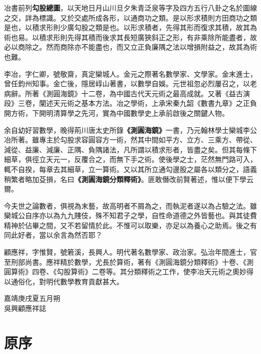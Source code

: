 \documentclass[11pt,a4paper]{article}
\begin{document}
冶書前列\textbf{勾股總圖}，以天地日月山川旦夕朱青泛泉等字及四方五行八卦之名於圖線之交，詳為標識。又於交處所成各形，以通商功之類。是以形求積則方田商功之類是也，以積求形則少廣勾股之類是也。以形求積者，先得其形而復求其積，故其為術也易。以積求形則先得其積而後求其長短廣狹斜正之形，有非乘除所能盡者，故必以商除之。然而商除亦不能盡也，而又立正負廉隅之法以增損附益之，故其為術也難。

李冶，字仁卿，號敬齋，真定欒城人。金元之際著名數學家、文學家。金末進士，曾任鈞州知事。金亡後，隱居崞山著書，以數學自娛。元世祖忽必烈屢召之，以老病辭。所著《測圓海鏡》十二卷，為中國古代天元術之最高成就。又著《益古演段》三卷，闡述天元術之基本方法。冶之學術，上承宋秦九韶《數書九章》之正負開方術，下開明清算學之先河，實為中國數學史上承前啟後之關鍵人物。

余自幼好習數學，晚得荊川唐太史所錄\textbf{《測圓海鏡》}一書，乃元翰林學士欒城李公冶所著。雖專主於勾股求容圓容方一術，然其中間如平方、立方、三乘方、帶從、減從、益廉、減廉、正隅、負隅諸法，凡所謂以積求形者，皆盡之矣。但其每條下細草，俱徑立天元一，反覆合之，而無下手之術。使後學之士，茫然無門路可入，輒不自揆，每章去其細草，立一算術。又以其所立通勾邊股之屬各以類分之，語義稍繁者略加芟損，名曰\textbf{《測圓海鏡分類釋術》}。匪敢僭改前賢著述，惟以便下學云爾。

今夫世之論數者，俱視為末藝，故高明者不屑為之，而執泥者遂以為占驗之法。雖欒城公自序亦以為九九賤伎，殊不知君子之學，自性命道德之外皆藝也。與其徒費精神於佔畢之間，又不若留情於此。不惟可以取樂，亦足以為養心之助焉。後之有同此好者，當以余言為然否耶？

顧應祥，字惟賢，號箬溪，長興人。明代著名數學家、政治家。弘治年間進士，官至刑部尚書。應祥精於數學，尤長於算術，著有《測圓海鏡分類釋術》十卷、《測圓算術》四卷、《勾股算術》二卷等。其分類釋術之工作，使李冶天元術之奧妙得以通俗化，對明代數學教育貢獻甚大。

\begin{flushright}
嘉靖庚戌夏五月朔\\
吳興顧應祥誌
\end{flushright}

\clearpage

\section*{原序}
\end{document}
